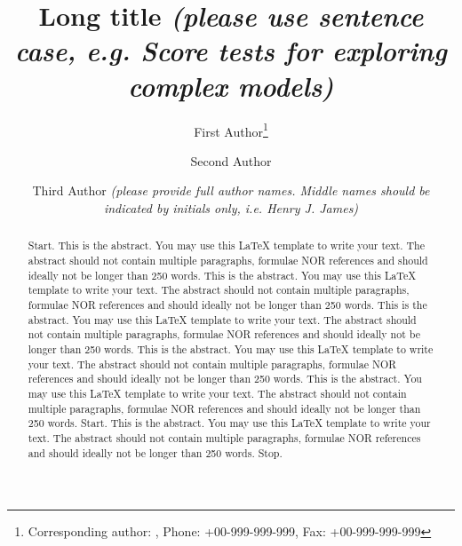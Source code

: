 \documentclass[bimj,fleqn]{w-art}
\theoremstyle{plain}
\theoremstyle{definition}
\begin{document}

\title[Running title]{Long title {\small\it (please use sentence case, e.g. Score tests for exploring complex models)}}
\author[First Author {\it{et al.}}]{First Author\footnote{Corresponding author: {}, Phone: +00-999-999-999, Fax: +00-999-999-999}} 
\address[\inst{1}]{First address {\it(please include the department and the postal address)}}
\author[dd]{Second Author}
\address[\inst{2}]{Second address {\it{(please include the department and the postal address)}}}
\author[]{Third Author {\small\it (please provide full author names. Middle names should be indicated by initials only, i.e. Henry J. James)}}
   

\begin{abstract}
Start. This is the abstract. You may use this LaTeX template to write your text.
The abstract should not contain multiple paragraphs, formulae NOR references and should ideally
not be longer than 250 words. This is the abstract. You may use this LaTeX template to write your text.
The abstract should not contain multiple paragraphs, formulae NOR references and should ideally
not be longer than 250 words.  This is the abstract. You may use this LaTeX template to write your text.
The abstract should not contain multiple paragraphs, formulae NOR references and should ideally
not be longer than 250 words.  This is the abstract. You may use this LaTeX template to write your text.
The abstract should not contain multiple paragraphs, formulae NOR references and should ideally
not be longer than 250 words.  This is the abstract. You may use this LaTeX template to write your text.
The abstract should not contain multiple paragraphs, formulae NOR references and should ideally
not be longer than 250 words. Start. This is the abstract. You may use this LaTeX template to write your text.
The abstract should not contain multiple paragraphs, formulae NOR references and should ideally
not be longer than 250 words. 
 Stop.
\end{abstract}
\end{document}
